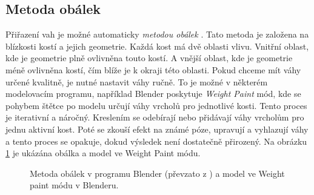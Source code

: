 \subsection{Metoda obálek}
Přiřazení vah je možné automaticky \textit{metodou obálek} \cite{envelopes}. Tato metoda je založena na blízkosti kostí a jejich geometrie. Každá kost má dvě oblasti vlivu. Vnitřní oblast, kde je geometrie plně ovlivněna touto kostí. A vnější oblast, kde je geometrie méně ovlivněna kostí, čím blíže je k okraji této oblasti. 
Pokud chceme mít váhy určené kvalitně, je nutné nastavit váhy ručně. To je možné v některém modelovacím programu, například Blender poskytuje \textit{Weight Paint} mód, kde se pohybem štětce po modelu určují váhy vrcholů pro jednotlivé kosti. Tento proces je iterativní a náročný. Kreslením se odebírají nebo přidávají váhy vrcholům pro jednu aktivní kost. Poté se zkouší efekt na známé póze, upravují a vyhlazují váhy a tento proces se opakuje, dokud výsledek není dostatečně přirozený. Na obrázku \ref{envelope_weight_paint} je ukázána obálka a model ve Weight Paint módu.
\begin{figure}[h]
\begin{center}
\qquad
{}
\caption{Metoda obálek v programu Blender (převzato z \cite{envelopes}) a model \cite{venom} ve Weight paint módu v Blenderu.} \label{envelope_weight_paint}
\end{center}
\end{figure}

